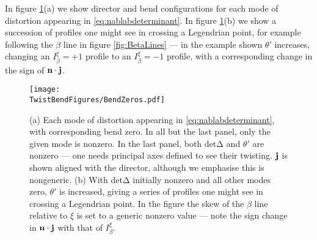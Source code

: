 { In figure \ref{fig:BendZeros}(a) we show director and bend configurations for each mode of distortion appearing in \eqref{eq:nablabdeterminant}. In figure \ref{fig:BendZeros}(b) we show a succession of profiles one might see in crossing a Legendrian point, for example following the $\beta$ line in figure \ref{fig:BetaLines} --- in the example shown $\theta'$ increases, changing an $I_\beta^\xi=+1$ profile to an $I_\beta^\xi=-1$ profile, with a corresponding change in the sign of $\mathbf{n} \cdot \mathbf{j}$. 
\begin{figure}[htbp]
    \centering
    \texttt{[image: \\TwistBendFigures/BendZeros.pdf]}
    \caption{(a) Each mode of distortion appearing in \eqref{eq:nablabdeterminant}, with corresponding bend zero. In all but the last panel, only the given mode is nonzero. In the last panel, both $\mathrm{det \Delta}$ and $\theta'$ are nonzero --- one needs principal axes defined to see their twisting. $\mathbf{j}$ is shown aligned with the director, although we emphasise this is nongeneric. (b) With $\mathrm{det\Delta}$ initially nonzero and all other modes zero, $\theta'$ is increased, giving a series of profiles one might see in crossing a Legendrian point. In the figure the skew of the $\beta$ line relative to $\xi$ is set to a generic nonzero value --- note the sign change in $\mathbf{n} \cdot \mathbf{j}$ with that of $I_\beta^\xi$.}
    \label{fig:BendZeros}
\end{figure}
}
